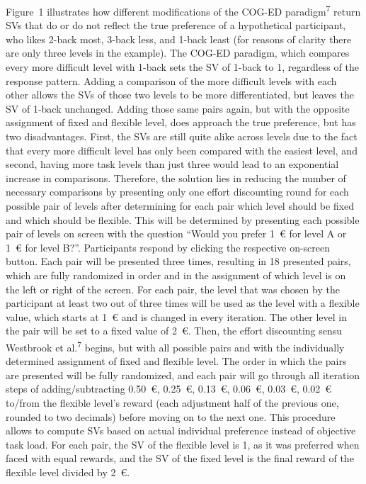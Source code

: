 \documentclass[
  man,floatsintext]{apa6}
\begin{document}
Figure~1 illustrates how different modifications of the COG-ED paradigm\textsuperscript{7} return SVs that do or do not reflect the true preference of a hypothetical participant, who likes 2-back most, 3-back less, and 1-back least (for reasons of clarity there are only three levels in the example).
The COG-ED paradigm, which compares every more difficult level with 1-back sets the SV of 1-back to 1, regardless of the response pattern.
Adding a comparison of the more difficult levels with each other allows the SVs of those two levels to be more differentiated, but leaves the SV of 1-back unchanged.
Adding those same pairs again, but with the opposite assignment of fixed and flexible level, does approach the true preference, but has two disadvantages.
First, the SVs are still quite alike across levels due to the fact that every more difficult level has only been compared with the easiest level, and second, having more task levels than just three would lead to an exponential increase in comparisons.
Therefore, the solution lies in reducing the number of necessary comparisons by presenting only one effort discounting round for each possible pair of levels after determining for each pair which level should be fixed and which should be flexible.
This will be determined by presenting each possible pair of levels on screen with the question ``Would you prefer 1~€ for level A or 1~€ for level B?''.
Participants respond by clicking the respective on-screen button.
Each pair will be presented three times, resulting in 18 presented pairs, which are fully randomized in order and in the assignment of which level is on the left or right of the screen.
For each pair, the level that was chosen by the participant at least two out of three times will be used as the level with a flexible value, which starts at 1~€ and is changed in every iteration.
The other level in the pair will be set to a fixed value of 2~€.
Then, the effort discounting sensu Westbrook et al.\textsuperscript{7} begins, but with all possible pairs and with the individually determined assignment of fixed and flexible level.
The order in which the pairs are presented will be fully randomized, and each pair will go through all iteration steps of adding/subtracting 0.50~€, 0.25~€, 0.13~€, 0.06~€, 0.03~€, 0.02~€ to/from the flexible level's reward (each adjustment half of the previous one, rounded to two decimals) before moving on to the next one.
This procedure allows to compute SVs based on actual individual preference instead of objective task load.
For each pair, the SV of the flexible level is 1, as it was preferred when faced with equal rewards, and the SV of the fixed level is the final reward of the flexible level divided by 2~€.
\end{document}
